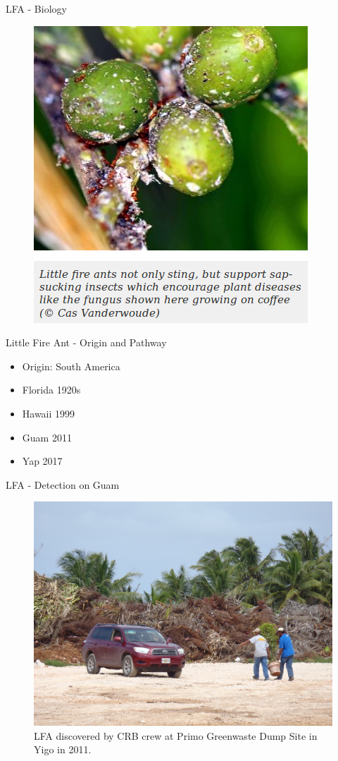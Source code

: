\documentclass[]{beamer}
\begin{document}
\begin{frame}{LFA - Biology}
\begin{figure}
	\includegraphics[height=0.85\textheight]{lfa-hemiptera.png}
\end{figure}
\end{frame}

\begin{frame}{Little Fire Ant - Origin and Pathway}
	\begin{itemize}
		\item Origin: South America
		\item Florida 1920s
		\item Hawaii 1999
		\item Guam 2011
		\item Yap 2017
	\end{itemize}
\end{frame}

\begin{frame}{LFA - Detection on Guam}
	\begin{figure}	
		\includegraphics[height=.75\textheight]{lfa-dump.png}
		\caption{LFA discovered by CRB crew at Primo Greenwaste Dump Site in Yigo in 2011.}
	\end{figure}
\end{frame}
\end{document}
